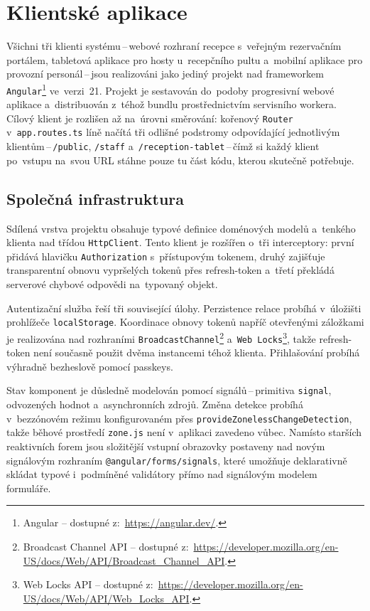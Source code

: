 \section{Klientské aplikace}
\label{sec:impl-clients}
Všichni tři klienti systému\,--\,webové rozhraní recepce s~veřejným rezervačním portálem, tabletová aplikace pro hosty u~recepčního pultu a~mobilní aplikace pro provozní personál\,--\,jsou realizováni jako jediný projekt nad frameworkem \texttt{Angular}\footnote{Angular -- dostupné z:~\url{https://angular.dev/}.} ve~verzi~21.
Projekt je sestavován do~podoby progresivní webové aplikace a~distribuován z~téhož bundlu prostřednictvím servisního workera.
Cílový klient je rozlišen až na~úrovni směrování: kořenový \texttt{Router} v~\texttt{app.routes.ts} líně načítá tři odlišné podstromy odpovídající jednotlivým klientům\,--\,\texttt{/public}, \texttt{/staff} a~\texttt{/reception-tablet}\,--\,čímž si každý klient po~vstupu na~svou URL stáhne pouze tu část kódu, kterou skutečně potřebuje.

\subsection{Společná infrastruktura}
\label{subsec:impl-clients-shared}
Sdílená vrstva projektu obsahuje typové definice doménových modelů a~tenkého klienta nad třídou \texttt{HttpClient}.
Tento klient je rozšířen o~tři interceptory: první přidává hlavičku \texttt{Authorization} s~přístupovým tokenem, druhý zajišťuje transparentní obnovu vypršelých tokenů přes refresh-token a~třetí překládá serverové chybové odpovědi na~typovaný objekt.

Autentizační služba řeší tři související úlohy.
Perzistence relace probíhá v~úložišti prohlížeče \texttt{localStorage}.
Koordinace obnovy tokenů napříč otevřenými záložkami je realizována nad rozhraními \texttt{BroadcastChannel}\footnote{Broadcast Channel API -- dostupné z:~\url{https://developer.mozilla.org/en-US/docs/Web/API/Broadcast_Channel_API}.} a~\texttt{Web~Locks}\footnote{Web Locks API -- dostupné z:~\url{https://developer.mozilla.org/en-US/docs/Web/API/Web_Locks_API}.}, takže refresh-token není současně použit dvěma instancemi téhož klienta.
Přihlašování probíhá výhradně bezheslově pomocí passkeys.

Stav komponent je důsledně modelován pomocí signálů\,--\,primitiva \texttt{signal}, odvozených hodnot a~asynchronních zdrojů.
Změna detekce probíhá v~bezzónovém režimu konfigurovaném přes \texttt{provideZonelessChangeDetection}, takže běhové prostředí \texttt{zone.js} není v~aplikaci zavedeno vůbec.
Namísto starších reaktivních forem jsou složitější vstupní obrazovky postaveny nad novým signálovým rozhraním \texttt{@angular/forms/signals}, které umožňuje deklarativně skládat typové i~podmíněné validátory přímo nad signálovým modelem formuláře.

